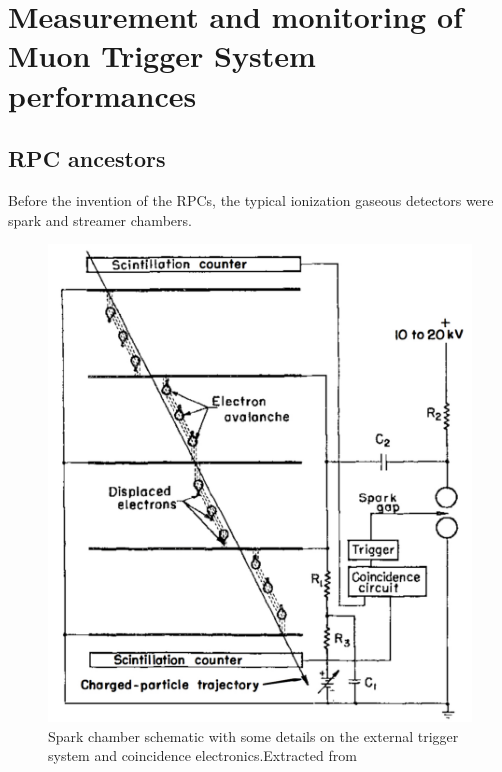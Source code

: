 \chapter{Measurement and monitoring of Muon Trigger System performances}

\section{RPC ancestors}
Before the invention of the RPCs, the typical ionization gaseous detectors were spark and streamer chambers.

\begin{figure}[!t]
\begin{center}
\includegraphics[width=0.95\linewidth]{Chapters/Performance/Figs/spark-chambers.pdf}
\caption{Spark chamber schematic with some details on the external trigger system and coincidence electronics.Extracted from \cite{wenzel:1966}}
\label{fig:SparkChamber}
\end{center}
\end{figure}

